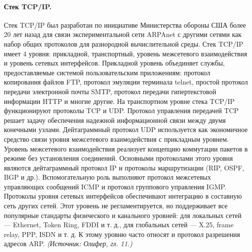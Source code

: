 \documentclass[a4paper,12pt]{article}
\begin{document}
\paragraph{Стек TCP/IP.}
Стек TCP/IP был разработан по инициативе Министерства обороны США более 20 лет назад для связи экспериментальной сети ARPAnet с другими сетями как набор общих протоколов для разнородной вычислительной среды. Стек TCP/IP имеет 4 уровня: прикладной, транспортный, уровень межсетевого взаимодействия и уровень сетевых интерфейсов. Прикладной уровень объединяет службы, предоставляемые системой пользовательским приложениям: протокол копирования файлов FTP, протокол эмуляции терминала telnet, простой протокол передачи электронной почты SMTP, протокол передачи гипертекстовой информации HTTP и многие другие. На транспортном уровне стека TCP/IP функционируют протоколы TCP и UDP. Протокол управления передачей TCP решает задачу обеспечения надежной информационной связи между двумя конечными узлами. Дейтаграммный протокол UDP используется как экономичное средство связи уровня межсетевого взаимодействия с прикладным уровнем. Уровень межсетевого взаимодействия реализует концепцию коммутации пакетов в режиме без установления соединений. Основными протоколами этого уровня являются дейтаграммный протокол IP и протоколы маршрутизации (RIP, OSPF, BGP и др.). Вспомогательную роль выполняют протокол межсетевых управляющих сообщений ICMP и протокол группового управления IGMP. Протоколы уровня сетевых интерфейсов обеспечивают интеграцию в составную сеть других сетей. Этот уровень не регламентируется, но поддерживает все популярные стандарты физического и канального уровней: для локальных сетей — Ethernet, Token Ring, FDDI и т. д., для глобальных сетей — X.25, frame relay, PPP, ISDN и т. д. К этому уровню часто относят и протокол разрешения адресов ARP.
\textit{(Источник: Олифер, гл. 11.)}
\end{document}
